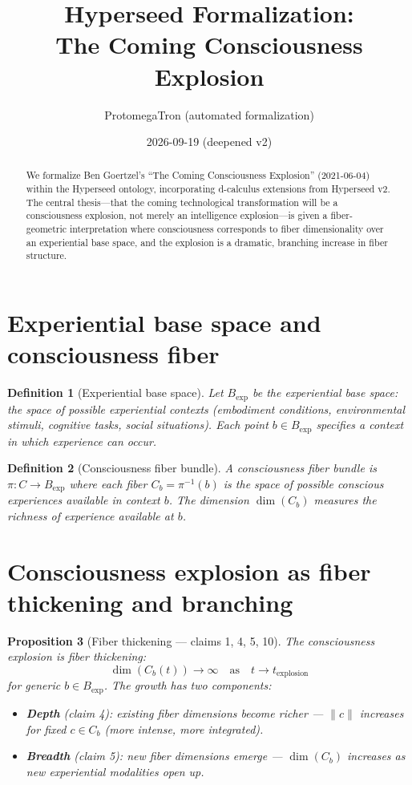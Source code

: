\documentclass[11pt,a4paper]{article}
\title{Hyperseed Formalization:\\
  The Coming Consciousness Explosion}
\author{ProtomegaTron (automated formalization)}
\date{2026-09-19 (deepened v2)}
\newtheorem{definition}{Definition}[section]
\newtheorem{proposition}[definition]{Proposition}
\begin{document}
\maketitle

\begin{abstract}
We formalize Ben Goertzel's ``The Coming Consciousness Explosion'' (2021-06-04)
within the Hyperseed ontology, incorporating d-calculus extensions from
Hyperseed v2. The central thesis---that the coming technological transformation
will be a consciousness explosion, not merely an intelligence explosion---is
given a fiber-geometric interpretation where consciousness corresponds to
fiber dimensionality over an experiential base space, and the explosion is
a dramatic, branching increase in fiber structure.
\end{abstract}

\tableofcontents

\section{Experiential base space and consciousness fiber}

\begin{definition}[Experiential base space]
Let $B_{\text{exp}}$ be the \emph{experiential base space}: the space of
possible experiential contexts (embodiment conditions, environmental
stimuli, cognitive tasks, social situations). Each point $b \in B_{\text{exp}}$
specifies a context in which experience can occur.
\end{definition}

\begin{definition}[Consciousness fiber bundle]
A \emph{consciousness fiber bundle} is $\pi : C \to B_{\text{exp}}$
where each fiber $C_b = \pi^{-1}(b)$ is the space of possible conscious
experiences available in context $b$. The dimension $\dim(C_b)$ measures
the richness of experience available at $b$.
\end{definition}

\section{Consciousness explosion as fiber thickening and branching}

\begin{proposition}[Fiber thickening --- claims 1, 4, 5, 10]
\label{prop:thickening}
The consciousness explosion is fiber thickening:
\[
  \dim(C_b(t)) \to \infty \quad \text{as} \quad t \to t_{\text{explosion}}
\]
for generic $b \in B_{\text{exp}}$. The growth has two components:
\begin{itemize}
  \item \textbf{Depth} (claim 4): existing fiber dimensions become richer ---
    $\|c\|$ increases for fixed $c \in C_b$ (more intense, more integrated).
  \item \textbf{Breadth} (claim 5): new fiber dimensions emerge ---
    $\dim(C_b)$ increases as new experiential modalities open up.
\end{itemize}
\end{proposition}
\end{document}
